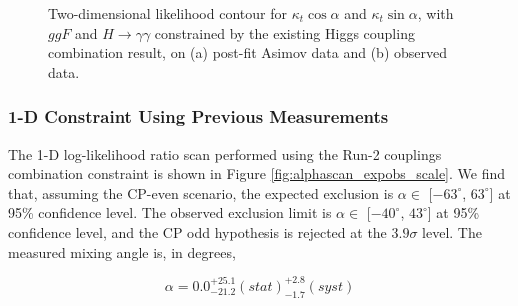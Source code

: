 \begin{figure}[htbp]
  \centering
  \caption{Two-dimensional likelihood contour for $\kappa_t \cos\alpha$ and $\kappa_t \sin\alpha$, with $ggF$ and $H \rightarrow \gamma\gamma$ constrained by the existing Higgs coupling combination result, on (a) post-fit Asimov data and (b) observed data.
  \label{fig:s2:contours}}
\end{figure}

\subsubsection{1-D Constraint Using Previous Measurements}

The 1-D log-likelihood ratio scan performed using the Run-2 couplings combination constraint is shown in Figure \ref{fig:alphascan_expobs_scale}. We find that, assuming the CP-even scenario, the expected exclusion is $\alpha \in$ [$-63^{\circ}$, $63^{\circ}$] at 95\% confidence level. The observed exclusion limit is  $\alpha \in$ [$-40^{\circ}$, $43^{\circ}$] at 95\% confidence level, and the CP odd hypothesis is rejected at the $3.9\sigma$ level. The measured mixing angle is, in degrees, 

\begin{equation}
\alpha = 0.0^{+25.1}_{-21.2}(stat)^{+2.8}_{-1.7}(syst)
\end{equation}

